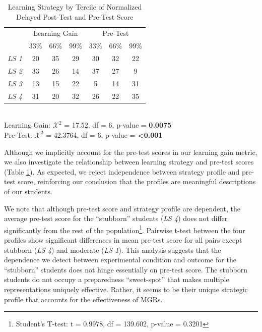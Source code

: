 \documentclass{edm_template}
\begin{document}
\begin{table}[hbtp]
\centering
\begin{tabular}{|l || c | c | c | c | c | c |}
\hline
& \multicolumn{3}{c|}{Learning Gain} & \multicolumn{3}{c|}{Pre-Test} \\ \cline{2-7}
&33\%&66\%&99\%&33\%&66\%&99\%\\ \hline \hline
  \emph{LS 1}  &   20& 35& 29 & 30 & 32 & 22 \\ \hline
  \emph{LS 2}&   33& 26& 14 & 37 & 27 & 9\\ \hline
\emph{LS 3}& 13& 15& 22 &5 & 14 & 31\\ \hline
  \emph{LS 4} & 31& 20& 32 & 26 & 22 & 35 \\ \hline
 \end{tabular} \\
Learning Gain: $\mathcal{X}^2$ = 17.52, df = 6, p-value = {\bf 0.0075} \\
Pre-Test: $\mathcal{X}^{2}$ = 42.3764, df = 6, p-value = {\bf <0.001}
\caption{Learning Strategy by Tercile of Normalized Delayed Post-Test and Pre-Test Score}
\label{tab:LS-by-score}
\end{table}

Although we implicitly account for the pre-test scores in our learning gain metric, we also investigate the relationship between learning strategy and pre-test scores (Table \ref{tab:LS-by-score}). As expected, we reject independence between strategy profile and pre-test score, reinforcing our conclusion that the profiles are meaningful descriptions of our students.

We note that although pre-test score and strategy profile are dependent, the average pre-test score for the ``stubborn'' students (\emph{LS 4}) does not differ significantly from the rest of the population\footnote{Student's T-test: t = 0.9978, df = 139.602, p-value = 0.3201}. Pairwise t-test between the four profiles show significant differences in mean pre-test score for all pairs except stubborn (\emph{LS 4}) and moderate (\emph{LS 1}). This analysis suggests that the dependence we detect between experimental condition and outcome for the ``stubborn'' students does not hinge essentially on pre-test score. The stubborn students do not occupy a preparedness ``sweet-spot'' that makes multiple representations uniquely effective. Rather, it seems to be their unique strategic profile that accounts for the effectiveness of MGRs.

\end{document}
